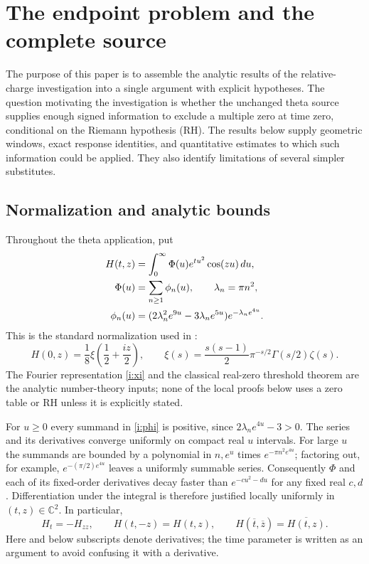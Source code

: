 \section{The endpoint problem and the complete source}
\label{sec:intro}

The purpose of this paper is to assemble the analytic results of the
relative-charge investigation into a single argument with explicit
hypotheses. The question motivating the investigation is whether the
unchanged theta source supplies enough signed information to exclude a
multiple zero at time zero, conditional on the Riemann hypothesis (RH).
The results below supply geometric windows, exact response identities,
and quantitative estimates to which such information could be applied.
They also identify limitations of several simpler substitutes.

\subsection{Normalization and analytic bounds}

Throughout the theta application, put
\begin{align}
 H(t,z)&=\int_0^\infty \Phi(u)e^{tu^2}\cos(zu)\,du,\label{i:source}\\
 \Phi(u)&=\sum_{n\geq1}\phi_n(u),\qquad \lambda_n=\pi n^2,\notag\\
 \phi_n(u)&=(2\lambda_n^2e^{9u}-3\lambda_ne^{5u})
                  e^{-\lambda_ne^{4u}}.\label{i:phi}
\end{align}
This is the standard normalization used in \cite{polymath}:
\begin{equation}
 H(0,z)=\frac18\xi\!\left(\frac12+\frac{iz}{2}\right),\qquad
 \xi(s)=\frac{s(s-1)}2\pi^{-s/2}\Gamma(s/2)\zeta(s).
 \label{i:xi}
\end{equation}
The Fourier representation \eqref{i:xi} and the classical real-zero
threshold theorem are the analytic number-theory inputs; none of the
local proofs below uses a zero table or RH unless it is explicitly stated.

For $u\geq0$ every summand in \eqref{i:phi} is positive, since
$2\lambda_ne^{4u}-3>0$. The series and its derivatives converge
uniformly on compact real $u$ intervals. For large $u$ the summands are
bounded by a polynomial in $n,e^u$ times $e^{-\pi n^2e^{4u}}$;
factoring out, for example, $e^{-(\pi/2)e^{4u}}$ leaves a uniformly
summable series. Consequently $\Phi$ and each of its fixed-order
derivatives decay faster than $e^{-cu^2-du}$ for any fixed real $c,d$.
Differentiation under the integral is therefore justified locally
uniformly in $(t,z)\in\mathbb C^2$. In particular,
\begin{equation}
 H_t=-H_{zz},\qquad
 H(t,-z)=H(t,z),\qquad
 H(\overline t,\overline z)=\overline{H(t,z)}.
 \label{i:heat}
\end{equation}
Here and below subscripts denote derivatives; the time parameter is
written as an argument to avoid confusing it with a derivative.


